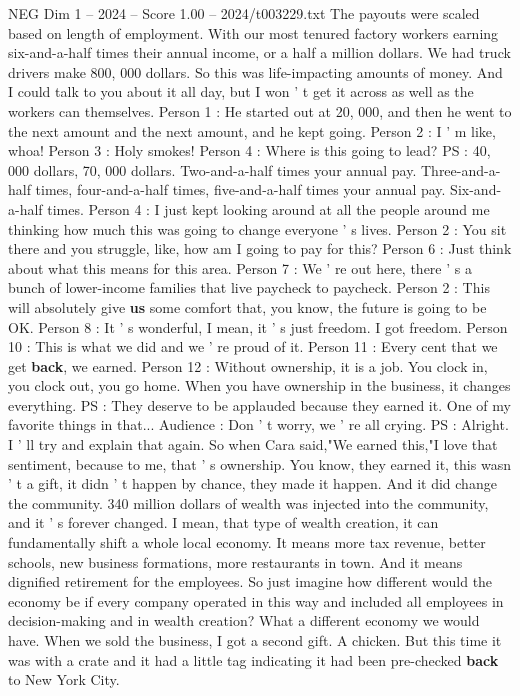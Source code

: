 \begin{textsample}{NEG Dim 1 – 2024 – Score 1.00 – 2024/t003229.txt}
The payouts were scaled based on length of employment.
With our most tenured factory workers earning six-and-a-half times their annual income, or a half a million dollars.
We had truck drivers make 800, 000 dollars.
So this was life-impacting amounts of money.
And I could talk to you about it all day, but I won ' t get it across as well as the workers can themselves.
Person 1 : He started out at 20, 000, and then he went to the next amount and the next amount, and he kept going.
Person 2 : I ' m like, whoa!
Person 3 : Holy smokes!
Person 4 : Where is this going to lead?
PS : 40, 000 dollars, 70, 000 dollars.
Two-and-a-half times your annual pay.
Three-and-a-half times, four-and-a-half times, five-and-a-half times your annual pay.
Six-and-a-half times.
Person 4 : I just kept looking around at all the people around me thinking how much this was going to change everyone ' s lives.
Person 2 : You sit there and you struggle, like, how am I going to pay for this?
Person 6 : Just think about what this means for this area.
Person 7 : We ' re out here, there ' s a bunch of lower-income families that live paycheck to paycheck.
Person 2 : This will absolutely give \textbf{us} some comfort that, you know, the future is going to be OK.
Person 8 : It ' s wonderful, I mean, it ' s just freedom.
I got freedom.
Person 10 : This is what we did and we ' re proud of it.
Person 11 : Every cent that we get \textbf{back}, we earned.
Person 12 : Without ownership, it is a job.
You clock in, you clock out, you go home.
When you have ownership in the business, it changes everything.
PS : They deserve to be applauded because they earned it.
One of my favorite things in that...
Audience : Don ' t worry, we ' re all crying.
PS : Alright.
I ' ll try and explain that again.
So when Cara said,"We earned this,"I love that sentiment, because to me, that ' s ownership.
You know, they earned it, this wasn ' t a gift, it didn ' t happen by chance, they made it happen.
And it did change the community. 340 million dollars of wealth was injected into the community, and it ' s forever changed.
I mean, that type of wealth creation, it can fundamentally shift a whole local economy.
It means more tax revenue, better schools, new business formations, more restaurants in town.
And it means dignified retirement for the employees.
So just imagine how different would the economy be if every company operated in this way and included all employees in decision-making and in wealth creation?
What a different economy we would have.
When we sold the business, I got a second gift.
A chicken.
But this time it was with a crate and it had a little tag indicating it had been pre-checked \textbf{back} to New York City.

\end{textsample}
